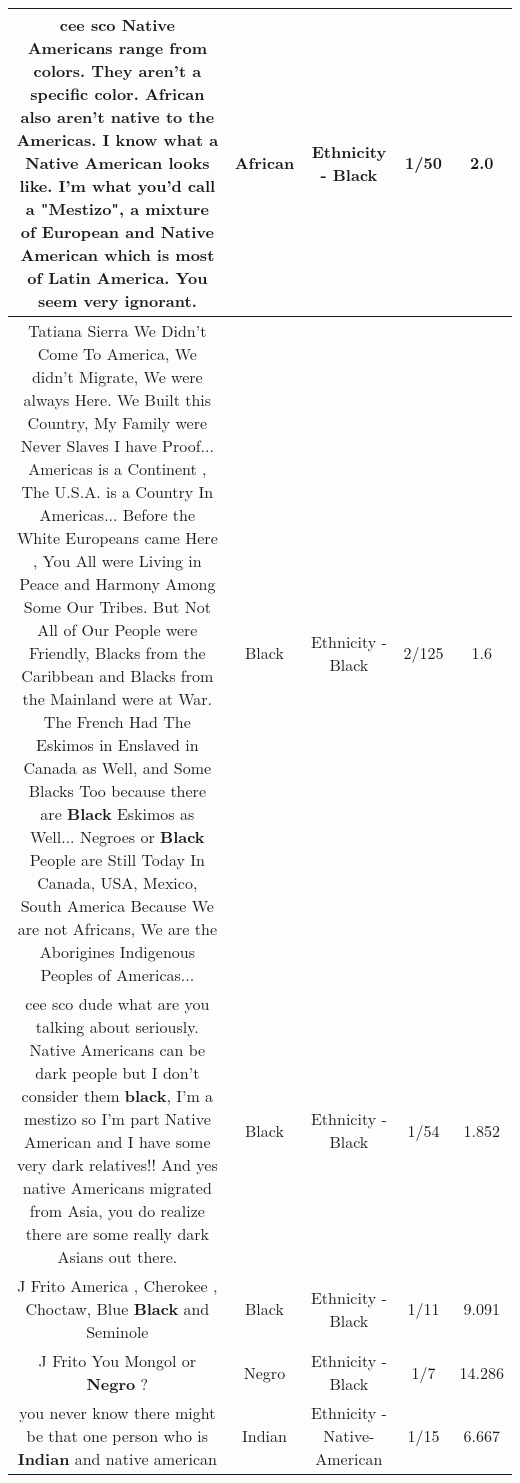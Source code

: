 \documentclass[11pt]{article}
\newlength\mylength
\begin{document}
\begin{center}
\begin{longtable}{|C{.65\mylength}|C{.30\mylength}|C{.12\mylength}|C{.12\mylength}|C{.12\mylength}|}
  \small cee sco Native Americans range from colors. They aren't a specific color. \textbf{African} also aren't native to the Americas. I know what a Native American looks like. I'm what you'd call a "Mestizo", a mixture of European and Native American which is most of Latin America. You seem very ignorant.\normalsize   & African & Ethnicity - Black & 1/50 & 2.0 \\  \hline
  \small Tatiana Sierra We Didn't Come To America, We didn't Migrate, We were always Here. We Built this Country, My Family were Never Slaves I have Proof... Americas is a Continent , The U.S.A. is a Country In Americas... Before the White Europeans came Here , You All were Living in Peace and Harmony Among Some Our Tribes. But Not All of Our People were Friendly, Blacks from the Caribbean and Blacks from the Mainland were at War. The French Had The Eskimos in Enslaved in Canada as Well, and Some Blacks Too because there are \textbf{Black} Eskimos as Well... Negroes or \textbf{Black} People are Still Today In Canada, USA, Mexico, South America Because We are not Africans, We are the Aborigines Indigenous Peoples of Americas...\normalsize   & Black & Ethnicity - Black & 2/125 & 1.6 \\  \hline
  \small cee sco dude what are you talking about seriously. Native Americans can be dark people but I don't consider them \textbf{black}, I'm a mestizo so I'm part Native American and I have some very dark relatives!! And yes native Americans migrated from Asia, you do realize there are some really dark Asians out there.\normalsize   & Black & Ethnicity - Black & 1/54 & 1.852 \\  \hline
  \small J Frito  America , Cherokee , Choctaw, Blue \textbf{Black} and Seminole\normalsize   & Black & Ethnicity - Black & 1/11 & 9.091 \\  \hline
  \small J Frito You Mongol or \textbf{Negro} ?\normalsize   & Negro & Ethnicity - Black & 1/7 & 14.286 \\  \hline
  \small you never know there might be that one person who is \textbf{Indian} and native american\normalsize   & Indian & Ethnicity - Native-American & 1/15 & 6.667 \\  \hline

\end{longtable}
\end{center}
\end{document}

